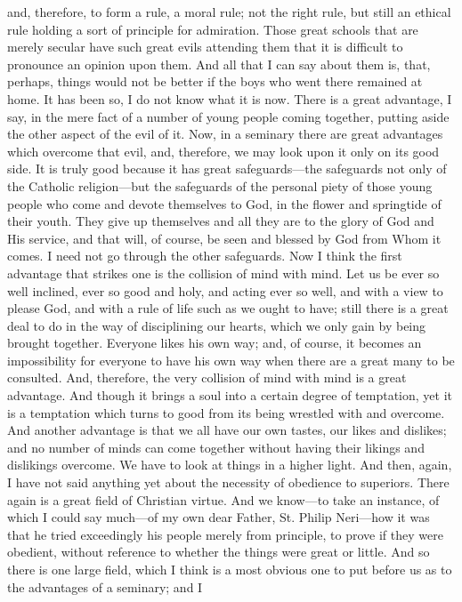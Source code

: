 and, therefore, to form a rule, a moral rule; not the right rule, but
still an ethical rule holding a sort of principle for admiration.
Those great schools that are merely secular have such great evils
attending them that it is difficult to pronounce an opinion upon them.
And all that I can say about them is, that, perhaps, things would not
be better if the boys who went there remained at home. It has been so,
I do not know what it is now. There is a great advantage, I say, in
the mere fact of a number of young people coming together, putting
aside the other aspect of the evil of it. Now, in a seminary there are
great advantages which overcome that evil, and, therefore, we may look
upon it only on its good side. It is truly good because it has great
safeguards—the safeguards not only of the Catholic religion—but
the safeguards of the personal piety of those young people who come
and devote themselves to God, in the flower and springtide of their
youth. They give up themselves and all they are to the glory of God
and His service, and that will, of course, be seen and blessed by God
from Whom it comes. I need not go through the other safeguards. Now I
think the first advantage that strikes one is the collision of mind
with mind. Let us be ever so well inclined, ever so good and holy, and
acting ever so well, and with a view to please God, and with a rule of
life such as we ought to have; still there is a great deal to do in
the way of disciplining our hearts, which we only gain by being
brought together. Everyone likes his own way; and, of course, it
becomes an impossibility for everyone to have his own way when there
are a great many to be consulted. And, therefore, the very collision
of mind with mind is a great advantage. And though it brings a soul
into a certain degree of temptation, yet it is a temptation which
turns to good from its being wrestled with and overcome. And another
advantage is that we all have our own tastes, our likes and dislikes;
and no number of minds can come together without having their likings
and dislikings overcome. We have to look at things in a higher light.
And then, again, I have not said anything yet about the necessity of
obedience to superiors. There again is a great field of Christian
virtue. And we know—to take an instance, of which I could say
much—of my own dear Father, St. Philip Neri—how it was that he
tried exceedingly his people merely from principle, to prove if they
were obedient, without reference to whether the things were great or
little. And so there is one large field, which I think is a most
obvious one to put before us as to the advantages of a seminary; and I
